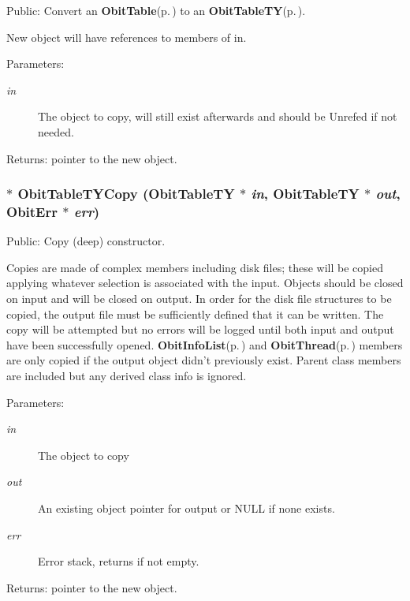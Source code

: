 Public: Convert an {\bf Obit\-Table}{\rm (p.\,\pageref{structObitTable})} to an {\bf Obit\-Table\-TY}{\rm (p.\,\pageref{structObitTableTY})}. 

New object will have references to members of in. \begin{Desc}
\item[Parameters:]
\begin{description}
\item[{\em in}]The object to copy, will still exist afterwards and should be Unrefed if not needed. \end{description}
\end{Desc}
\begin{Desc}
\item[Returns:]pointer to the new object. \end{Desc}
\subsubsection{$\ast$ Obit\-Table\-TYCopy ({\bf Obit\-Table\-TY} $\ast$ {\em in}, {\bf Obit\-Table\-TY} $\ast$ {\em out}, {\bf Obit\-Err} $\ast$ {\em err})}\label{ObitTableTY_8h_a14}


Public: Copy (deep) constructor. 

Copies are made of complex members including disk files; these will be copied applying whatever selection is associated with the input. Objects should be closed on input and will be closed on output. In order for the disk file structures to be copied, the output file must be sufficiently defined that it can be written. The copy will be attempted but no errors will be logged until both input and output have been successfully opened. {\bf Obit\-Info\-List}{\rm (p.\,\pageref{structObitInfoList})} and {\bf Obit\-Thread}{\rm (p.\,\pageref{structObitThread})} members are only copied if the output object didn't previously exist. Parent class members are included but any derived class info is ignored. \begin{Desc}
\item[Parameters:]
\begin{description}
\item[{\em in}]The object to copy \item[{\em out}]An existing object pointer for output or NULL if none exists. \item[{\em err}]Error stack, returns if not empty. \end{description}
\end{Desc}
\begin{Desc}
\item[Returns:]pointer to the new object. \end{Desc}
